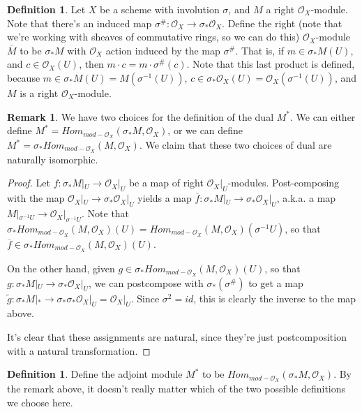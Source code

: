 \documentclass[edeposit,fullpage]{uiucthesis2009}
\newcommand{\mc}{\mathcal}
\theoremstyle{plain}
\numberwithin{lemma}{section}
\theoremstyle{definition}
\newtheorem{definition}[lemma]{Definition}
\newtheorem{remark}[lemma]{Remark}
\begin{document}
\begin{definition}
Let $X$ be a scheme with involution $\sigma$, and $M$ a right $\mc
O_X$-module. Note that there's an induced map $\sigma^{\#} : \mc O_X
\rightarrow \sigma_*\mc O_X$. Define the right (note that we're
working with sheaves of commutative rings, so we can do this) $\mc O_X$-module $\overline
M$ to be $\sigma_*M$ with $\mc O_X$ action induced by the map
$\sigma^{\#}$. That is, if $m \in \sigma_*M(U)$, and $c \in \mc
O_X(U)$, then $m \cdot c = m \cdot \sigma^{\#}(c)$. Note that this
last product is defined, because $m \in \sigma_*M(U) =
M(\sigma^{-1}(U))$, $c \in \sigma_*\mc O_X(U) = \mc
O_X(\sigma^{-1}(U))$, and $M$ is a right $\mc O_X$-module. 
\end{definition}



\begin{remark}
We have two choices for the definition of the dual $M^*$. We can
either define $M^* = Hom_{mod-\mc O_X}(\sigma_*M,\mc O_X)$, or we can
define $M^* = \sigma_*Hom_{mod-\mc O_X}(M,\mc O_X)$. We claim that
these two choices of dual are naturally isomorphic. 
\end{remark}



\begin{proof}
Let $f : \sigma_*M|_U \rightarrow \mc O_X|_U$ be a map of right $\mc
O_X|_U$-modules. Post-composing with the map $\mc O_X|_U \rightarrow
\sigma_* \mc O_X|_U$ yields a map $\overline f : \sigma_*M|_U
\rightarrow \sigma_*\mc O_X|_U$, a.k.a. a map $M|_{\sigma^{-1}U}
\rightarrow \mc O_X|_{\sigma^{-1}U}$. Note that $\sigma_*Hom_{mod-\mc
  O_X}(M,\mc O_X)(U) = Hom_{mod-\mc
  O_X}(M,\mc O_X)(\sigma^{-1}U)$, so that $\overline f \in \sigma_*Hom_{mod-\mc
  O_X}(M,\mc O_X)(U)$.

On the other hand, given $g \in \sigma_*Hom_{mod-\mc O_X}(M,\mc
O_X)(U)$, so that $g : \sigma_*M|_U
\rightarrow \sigma_*\mc O_X|_U$, we can postcompose with
$\sigma_*(\sigma^\#)$ to get a map $\widetilde g : \sigma_*M|_*
\rightarrow \sigma_*\sigma_*\mc O_X|_U = \mc O_X|_U$. Since $\sigma^2
= id$, this is clearly the inverse to the map above. 

It's clear that these assignments are natural, since they're just
postcomposition with a natural transformation. 
\end{proof}

\begin{definition}
Define the adjoint module $M^*$ to be $Hom_{mod-\mc O_X}(\sigma_*M,\mc
O_X)$. By the remark above, it doesn't really matter which of the two
possible definitions we choose here. 
\end{definition}
\end{document}
